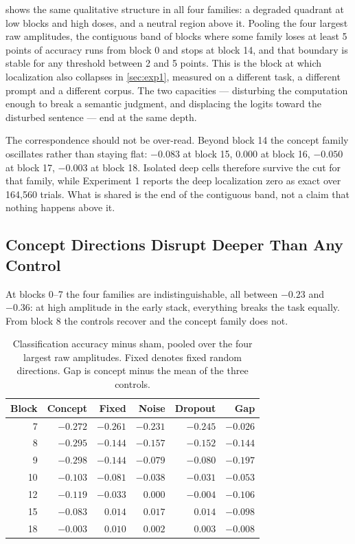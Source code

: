  shows the same qualitative structure in all four families: a degraded quadrant at low blocks and high doses, and a neutral region above it.
Pooling the four largest raw amplitudes, the contiguous band of blocks where some family loses at least 5 points of accuracy runs from block 0 and stops at block 14, and that boundary is stable for any threshold between 2 and 5 points.
This is the block at which localization also collapses in \cref{sec:exp1}, measured on a different task, a different prompt and a different corpus.
The two capacities --- disturbing the computation enough to break a semantic judgment, and displacing the logits toward the disturbed sentence --- end at the same depth.

The correspondence should not be over-read.
Beyond block 14 the concept family oscillates rather than staying flat: $-0.083$ at block 15, $0.000$ at block 16, $-0.050$ at block 17, $-0.003$ at block 18.
Isolated deep cells therefore survive the cut for that family, while Experiment 1 reports the deep localization zero as exact over 164,560 trials.
What is shared is the end of the contiguous band, not a claim that nothing happens above it.

\subsection{Concept Directions Disrupt Deeper Than Any Control}

At blocks 0--7 the four families are indistinguishable, all between $-0.23$ and $-0.36$: at high amplitude in the early stack, everything breaks the task equally.
From block 8 the controls recover and the concept family does not.

\begin{table}[H]
\centering
\small
\begin{tabular}{rrrrrr}
\toprule
Block & Concept & Fixed & Noise & Dropout & Gap \\
\midrule
7  & $-0.272$ & $-0.261$ & $-0.231$ & $-0.245$ & $-0.026$ \\
8  & $-0.295$ & $-0.144$ & $-0.157$ & $-0.152$ & $-0.144$ \\
9  & $-0.298$ & $-0.144$ & $-0.079$ & $-0.080$ & $-0.197$ \\
10 & $-0.103$ & $-0.081$ & $-0.038$ & $-0.031$ & $-0.053$ \\
12 & $-0.119$ & $-0.033$ & $0.000$  & $-0.004$ & $-0.106$ \\
15 & $-0.083$ & $0.014$  & $0.017$  & $0.014$  & $-0.098$ \\
18 & $-0.003$ & $0.010$  & $0.002$  & $0.003$  & $-0.008$ \\
\bottomrule
\end{tabular}
\caption{Classification accuracy minus sham, pooled over the four largest raw amplitudes. Fixed denotes fixed random directions. Gap is concept minus the mean of the three controls.}
\label{tab:exp4depth}
\end{table}

